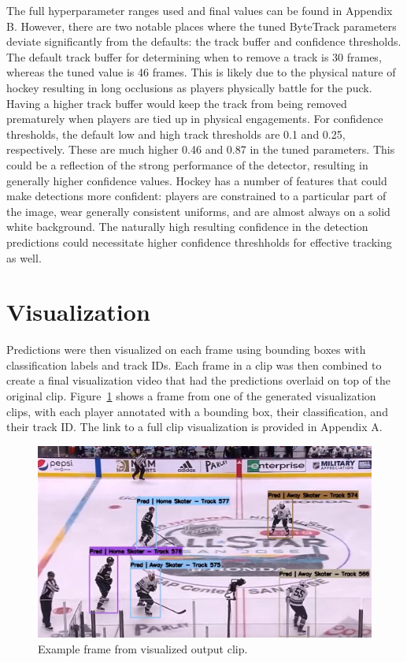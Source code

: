 \documentclass[12pt,stu,donotrepeattitle,floatsintext]{apa7}
\newcommand{\customsection}[2]{
  \phantomsection
  \section*{#1}\label{#2}
  \addcontentsline{toc}{section}{#1}
}
\begin{document}
    The full hyperparameter ranges used and final values can be found in Appendix B.
    However, there are two notable places where the tuned ByteTrack parameters deviate significantly from the defaults: the track buffer and confidence thresholds.
    The default track buffer for determining when to remove a track is 30 frames, whereas the tuned value is 46 frames.
    This is likely due to the physical nature of hockey resulting in long occlusions as players physically battle for the puck.
    Having a higher track buffer would keep the track from being removed prematurely when players are tied up in physical engagements.
    For confidence thresholds, the default low and high track thresholds are 0.1 and 0.25, respectively.
    These are  much higher 0.46 and 0.87 in the tuned parameters.
    This could be a reflection of the strong performance of the detector, resulting in generally higher confidence values.
    Hockey has a number of features that could make detections more confident: players are constrained to a particular part of the image, wear generally consistent uniforms, and are almost always on a solid white background.
    The naturally high resulting confidence in the detection predictions could necessitate higher confidence threshholds for effective tracking as well.


    \customsection{Visualization}{visualization}
    Predictions were then visualized on each frame using bounding boxes with classification labels and track IDs.
    Each frame in a clip was then combined to create a final visualization video that had the predictions overlaid on top of the original clip.
    Figure~\ref{fig:visualization} shows a frame from one of the generated visualization clips, with each player annotated with a bounding box, their classification, and their track ID.
    The link to a full clip visualization is provided in Appendix A.

    \begin{figure}[tb]
        \centering
        \includegraphics[width=1\textwidth]{figures/visualization}
        \caption{Example frame from visualized output clip.}
        \label{fig:visualization}
    \end{figure}
\end{document}
